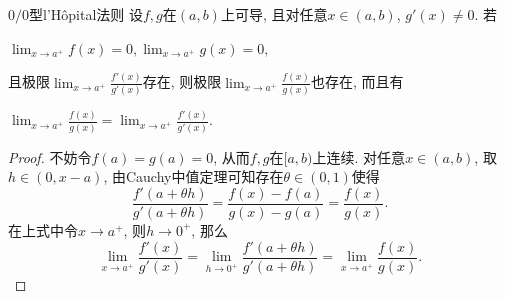\begin{theorem}{$0/0$型l’Hôpital法则}
	设$f,g$在$(a,b)$上可导, 且对任意$x \in (a,b)$, $g'(x) \neq 0$. 若
	
	\begin{center}
		$\displaystyle \lim_{x \to a^+} f(x) = 0, \lim_{x \to a^+} g(x) = 0, $
	\end{center}
	
	\noindent
	且极限$\lim_{x \to a^+} \frac{f'(x)}{g'(x)}$存在, 则极限$\lim_{x \to a^+} \frac{f(x)}{g(x)}$也存在, 而且有
	
	\begin{center}
		$\displaystyle \lim_{x \to a^+} \frac{f(x)}{g(x)} = \lim_{x \to a^+} \frac{f'(x)}{g'(x)}. $
	\end{center}
\end{theorem}
\begin{proof}
	不妨令$f(a)=g(a)=0$, 从而$f,g$在$[a,b)$上连续. 对任意$x \in (a,b)$, 取$h \in (0,x-a)$, 由Cauchy中值定理可知存在$\theta \in (0,1)$使得$$\frac{f'(a+\theta h)}{g'(a+\theta h)} = \frac{f(x)-f(a)}{g(x)-g(a)} = \frac{f(x)}{g(x)}. $$
	在上式中令$x \to a^+$, 则$h \to 0^+$, 那么$$\lim_{x \to a^+} \frac{f'(x)}{g'(x)} = \lim_{h \to 0^+} \frac{f'(a+\theta h)}{g'(a+\theta h)} = \lim_{x \to a^+} \frac{f(x)}{g(x)}. $$
\end{proof}

